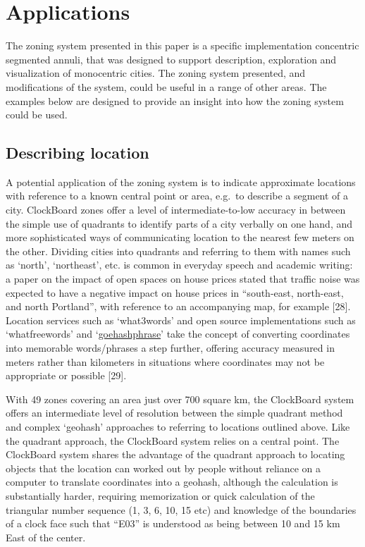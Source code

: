 \documentclass{josis}
\begin{document}
\hypertarget{applications}{%
\section{Applications}\label{applications}}

The zoning system presented in this paper is a specific implementation concentric segmented annuli, that was designed to support description, exploration and visualization of monocentric cities.
The zoning system presented, and modifications of the system, could be useful in a range of other areas.
The examples below are designed to provide an insight into how the zoning system could be used.

\hypertarget{describing-location}{%
\subsection{Describing location}\label{describing-location}}

A potential application of the zoning system is to indicate approximate locations with reference to a known central point or area, e.g.~to describe a segment of a city.
ClockBoard zones offer a level of intermediate-to-low accuracy in between the simple use of quadrants to identify parts of a city verbally on one hand, and more sophisticated ways of communicating location to the nearest few meters on the other.
Dividing cities into quadrants and referring to them with names such as `north', `northeast', etc. is common in everyday speech and academic writing: a paper on the impact of open spaces on house prices stated that traffic noise was expected to have a negative impact on house prices in ``south-east, north-east, and north Portland'', with reference to an accompanying map, for example {[}28{]}.
Location services such as `what3words' and open source implementations such as `whatfreewords' and `\href{https://www.qalocate.com/solutions/geohashphrase/}{goehashphrase}' take the concept of converting coordinates into memorable words/phrases a step further, offering accuracy measured in meters rather than kilometers in situations where coordinates may not be appropriate or possible {[}29{]}.

With 49 zones covering an area just over 700 square km, the ClockBoard system offers an intermediate level of resolution between the simple quadrant method and complex `geohash' approaches to referring to locations outlined above.
Like the quadrant approach, the ClockBoard system relies on a central point.
The ClockBoard system shares the advantage of the quadrant approach to locating objects that the location can worked out by people without reliance on a computer to translate coordinates into a geohash, although the calculation is substantially harder, requiring memorization or quick calculation of the triangular number sequence (1, 3, 6, 10, 15 etc) and knowledge of the boundaries of a clock face such that ``E03'' is understood as being between 10 and 15 km East of the center.
\end{document}
